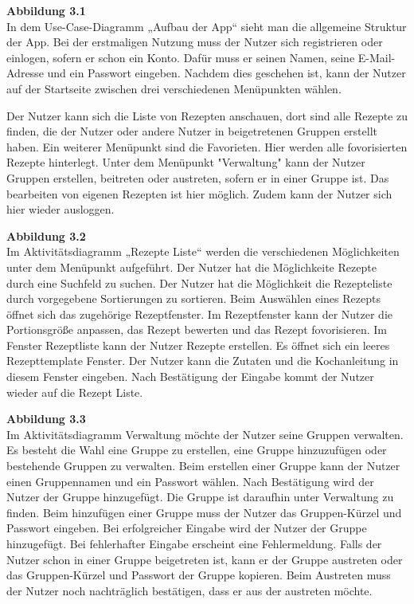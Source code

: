 \documentclass[parskip=full]{scrartcl}
\begin{document}
\textbf{Abbildung 3.1}\\
In dem Use-Case-Diagramm „Aufbau der App“ sieht man die allgemeine Struktur der App.
Bei der erstmaligen Nutzung muss der Nutzer sich registrieren oder einlogen, sofern er schon ein Konto.
Dafür muss er seinen Namen, seine E-Mail-Adresse und ein Passwort eingeben.
Nachdem dies geschehen ist, kann der Nutzer auf der Startseite zwischen drei verschiedenen Menüpunkten wählen.

Der Nutzer kann sich die Liste von Rezepten anschauen, dort sind alle Rezepte zu finden, die der Nutzer oder andere Nutzer in beigetretenen Gruppen erstellt haben.
Ein weiterer Menüpunkt sind die Favorieten.
Hier werden alle fovorisierten Rezepte hinterlegt.
Unter dem Menüpunkt "Verwaltung" kann der Nutzer Gruppen erstellen, beitreten oder austreten, sofern er in einer Gruppe ist.
Das bearbeiten von eigenen Rezepten ist hier möglich.
Zudem kann der Nutzer sich hier wieder ausloggen.

\textbf{Abbildung 3.2}\\
Im Aktivitätsdiagramm „Rezepte Liste“ werden die verschiedenen Möglichkeiten unter dem Menüpunkt aufgeführt.
Der Nutzer hat die Möglichkeite Rezepte durch eine Suchfeld zu suchen.
Der Nutzer hat die Möglichkeit die Rezepteliste durch vorgegebene Sortierungen zu sortieren.
Beim Auswählen eines Rezepts öffnet sich das zugehörige Rezeptfenster.
Im Rezeptfenster kann der Nutzer die Portionsgröße anpassen, das Rezept bewerten und das Rezept fovorisieren.
Im Fenster Rezeptliste kann der Nutzer Rezepte erstellen.
Es öffnet sich ein leeres Rezepttemplate Fenster.
Der Nutzer kann die Zutaten und die Kochanleitung in diesem Fenster eingeben.
Nach Bestätigung der Eingabe kommt der Nutzer wieder auf die Rezept Liste.

\textbf{Abbildung 3.3}\\
Im Aktivitätsdiagramm Verwaltung  möchte der Nutzer seine Gruppen verwalten.
Es besteht die Wahl eine Gruppe zu erstellen, eine Gruppe hinzuzufügen oder bestehende Gruppen zu verwalten.
Beim erstellen einer Gruppe kann der Nutzer einen Gruppennamen und ein Passwort wählen.
Nach Bestätigung wird der Nutzer der Gruppe hinzugefügt.
Die Gruppe ist daraufhin unter Verwaltung zu finden.
Beim hinzufügen einer Gruppe muss der Nutzer das Gruppen-Kürzel und Passwort eingeben.
Bei erfolgreicher Eingabe wird der Nutzer der Gruppe hinzugefügt.
Bei fehlerhafter Eingabe erscheint eine Fehlermeldung.
Falls der Nutzer schon in einer Gruppe beigetreten ist, kann er der Gruppe austreten oder das Gruppen-Kürzel und Passwort der Gruppe kopieren.
Beim Austreten muss der Nutzer noch nachträglich bestätigen, dass er aus der austreten möchte.
\newpage
\end{document}
